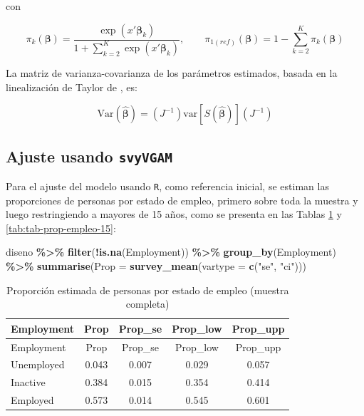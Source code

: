 \documentclass[
  spanish,
  12pt,
]{book}
\newenvironment{Shaded}{\begin{snugshade}}{\end{snugshade}}
\newcommand{\AttributeTok}[1]{\textcolor[rgb]{0.13,0.29,0.53}{#1}}
\newcommand{\FunctionTok}[1]{\textcolor[rgb]{0.13,0.29,0.53}{\textbf{#1}}}
\newcommand{\NormalTok}[1]{#1}
\newcommand{\SpecialCharTok}[1]{\textcolor[rgb]{0.81,0.36,0.00}{\textbf{#1}}}
\newcommand{\StringTok}[1]{\textcolor[rgb]{0.31,0.60,0.02}{#1}}
\begin{document}
con

\[
\pi_k(\boldsymbol{\beta}) = \frac{\exp(x'\boldsymbol{\beta}_k)}{1 + \sum_{k=2}^{K} \exp(x'\boldsymbol{\beta}_k)}, \qquad \pi_{1(ref)}(\boldsymbol{\beta}) = 1 - \sum_{k=2}^{K} \pi_k(\boldsymbol{\beta})
\]

La matriz de varianza-covarianza de los parámetros estimados, basada en la linealización de Taylor de \citet{binder1983variances}, es:

\[
\hat{\text{Var}}(\hat{\boldsymbol{\beta}}) = (J^{-1}) \text{var}[S(\hat{\boldsymbol{\beta}})] (J^{-1})
\]

\subsection{\texorpdfstring{Ajuste usando \texttt{svyVGAM}}{Ajuste usando svyVGAM}}\label{ajuste-usando-svyvgam}

Para el ajuste del modelo usando \texttt{R}, como referencia inicial, se estiman las proporciones de personas por estado de empleo, primero sobre toda la muestra y luego restringiendo a mayores de 15 años, como se presenta en las Tablas \ref{tab:tab-prop-empleo} y \ref{tab:tab-prop-empleo-15}:

\begin{Shaded}
\begin{Highlighting}[]
\NormalTok{diseno }\SpecialCharTok{\%\textgreater{}\%}
  \FunctionTok{filter}\NormalTok{(}\SpecialCharTok{!}\FunctionTok{is.na}\NormalTok{(Employment))  }\SpecialCharTok{\%\textgreater{}\%}
  \FunctionTok{group\_by}\NormalTok{(Employment) }\SpecialCharTok{\%\textgreater{}\%}
  \FunctionTok{summarise}\NormalTok{(}\AttributeTok{Prop =} \FunctionTok{survey\_mean}\NormalTok{(}\AttributeTok{vartype =} \FunctionTok{c}\NormalTok{(}\StringTok{"se"}\NormalTok{, }\StringTok{"ci"}\NormalTok{))) }
\end{Highlighting}
\end{Shaded}

\begin{longtable}[]{@{}lcccc@{}}
\caption{\label{tab:tab-prop-empleo}Proporción estimada de personas por estado de empleo (muestra completa)}\tabularnewline
\toprule\noalign{}
Employment & Prop & Prop\_se & Prop\_low & Prop\_upp \\
\midrule\noalign{}
\endfirsthead
\toprule\noalign{}
Employment & Prop & Prop\_se & Prop\_low & Prop\_upp \\
\midrule\noalign{}
\endhead
\bottomrule\noalign{}
\endlastfoot
Unemployed & 0.043 & 0.007 & 0.029 & 0.057 \\
Inactive & 0.384 & 0.015 & 0.354 & 0.414 \\
Employed & 0.573 & 0.014 & 0.545 & 0.601 \\
\end{longtable}
\end{document}
